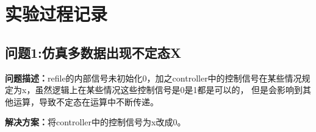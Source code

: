 \section{实验过程记录}
\subsection{问题1:仿真多数据出现不定态X}
\textbf{问题描述：}refile的内部信号未初始化0，加之controller中的控制信号在某些情况规定为x，虽然逻辑上在某些情况这些控制信号是0是1都是可以的，
但是会影响到其他运算，导致不定态在运算中不断传递。

\textbf{解决方案：}将controller中的控制信号为x改成0。